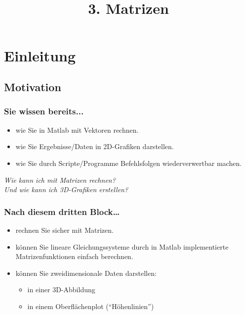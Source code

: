 

\title{\\{\scriptsize 3. Matrizen}}


\setcounter{mchapter}{3}
\setcounter{mexercise}{0}


  

    \section{Einleitung}

    \subsection{Motivation}
    \begin{frame}
        \frametitle{Sie wissen bereits...}
        \begin{itemize}
            \item wie Sie in Matlab mit Vektoren rechnen.
            \item wie Sie Ergebnisse/Daten in 2D-Grafiken darstellen.
            \item wie Sie durch Scripte/Programme Befehlsfolgen wiederverwertbar machen.
        \end{itemize}

        \textit{Wie kann ich mit Matrizen rechnen?} \\
        \textit{Und wie kann ich 3D-Grafiken erstellen?}
    \end{frame}

    \begin{frame}
        \frametitle{Nach diesem dritten Block…}
        \begin{itemize}
            \item rechnen Sie sicher mit Matrizen.
            \item können Sie lineare Gleichungssysteme durch in Matlab implementierte Matrizenfunktionen einfach berechnen.
            \item können Sie zweidimensionale Daten darstellen:
            \begin{itemize}
                \item in einer 3D-Abbildung
                \item in einem Oberflächenplot (``Höhenlinien'')
            \end{itemize}
        \end{itemize}
    \end{frame}

